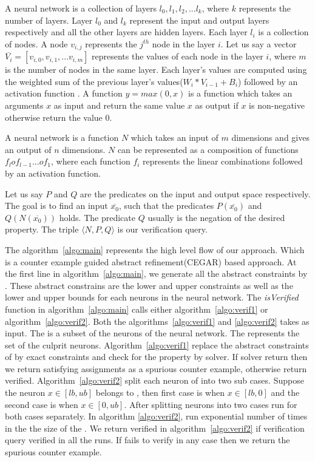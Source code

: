 A neural network is a collection of layers $l_0, l_1, l_2, ... l_k$, where $k$ represents the number of layers. 
Layer $l_0$ and $l_k$ represent the input and output layers respectively and all the other layers are hidden layers.
Each layer $l_i$ is a collection of nodes. A node $v_{i,j}$ represents the $j^{th}$ node in the layer $i$. 
Let us say a vector $\overline{V_i} = [v_{i,0}, v_{i,1}, ... v_{i,m}]$ represents the values of each node in the layer $i$, where $m$ is the number of nodes in the same layer. 
Each layer's values are computed using the weighted sum of the previous layer's values($W_i * V_{i-1} + B_i$) followed by an activation function
\relu{}. A function $y = max(0,x)$ is a \relu{} function which takes an arguments $x$ as input and return the same value $x$ as output if 
$x$ is non-negative otherwise return the value 0. 

A neural network is a function $N$ which takes an input of $m$ dimensions and gives an output of $n$ dimensions.
$N$ can be represented as a composition of functions $f_l o f_{l-1} ... o f_1$, where each function $f_i$ represents the linear combinations followed by an activation function. 

Let us say $P$ and $Q$ are the predicates on the input and output space respectively. 
The goal is to find an input $\overline{x_0}$, such that the predicates $P(\overline{x_0})$ and $Q(N(\overline{x_0}))$ holds. 
The predicate $Q$ usually is the negation of the desired property. The triple $\langle N, P, Q \rangle$ is our verification query. 

The algorithm~\ref{algo:main} represents the high level flow of our approach. Which is a counter example guided abstract refinement(CEGAR) based approach. 
At the first line in algorithm~\ref{algo:main}, we generate all the abstract constraints by \deeppoly{}. These abstract constrains
are the lower and upper constraints as well as the lower and upper bounds for each neurons in the neural network.
The \emph{isVerified} function in algorithm~\ref{algo:main} calls either algorithm~\ref{algo:verif1} or algorithm~\ref{algo:verif2}. 
Both the algorithms~\ref{algo:verif1} and \ref{algo:verif2} takes \markednewrons{} as input. The \markednewrons{} 
is a subset of the neurons of the neural network. The \markednewrons{} represents the set of the culprit neurons. 
Algorithm~\ref{algo:verif1} replace the abstract constraints of \markednewrons{} by exact constraints and check for the 
property by \milp{} solver. If \milp{} solver return \sat{} then we return satisfying assignments as a spurious counter example, 
otherwise return verified. Algorithm~\ref{algo:verif2} split each neuron of \markednewrons{} into two sub cases. Suppose the 
neuron $x\in [lb,ub]$ belongs to \markednewrons{}, then first case is when $x \in [lb,0]$ and the second case is when $x \in [0,ub]$.   
After splitting neurons into two cases \deeppoly{} run for both cases separately. In algorithm \ref{algo:verif2}, \deeppoly{}
run exponential number of times in the the size of the \markednewrons{}. We return verified in algorithm~\ref{algo:verif2} if 
verification query verified in all the \deeppoly{} runs. If \deeppoly{} fails to verify in any case then we return the spurious counter example. 


